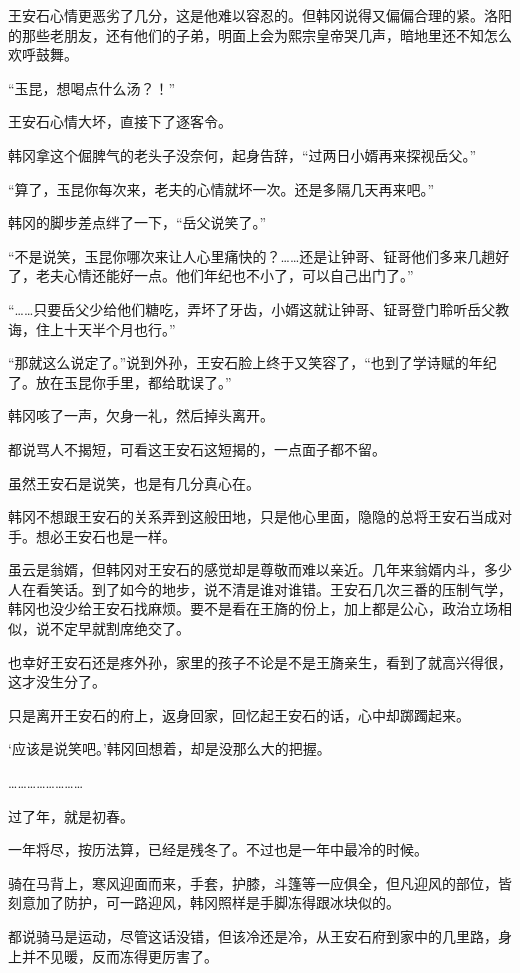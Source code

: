 王安石心情更恶劣了几分，这是他难以容忍的。但韩冈说得又偏偏合理的紧。洛阳的那些老朋友，还有他们的子弟，明面上会为熙宗皇帝哭几声，暗地里还不知怎么欢呼鼓舞。

“玉昆，想喝点什么汤？！”

王安石心情大坏，直接下了逐客令。

韩冈拿这个倔脾气的老头子没奈何，起身告辞，“过两日小婿再来探视岳父。”

“算了，玉昆你每次来，老夫的心情就坏一次。还是多隔几天再来吧。”

韩冈的脚步差点绊了一下，“岳父说笑了。”

“不是说笑，玉昆你哪次来让人心里痛快的？……还是让钟哥、钲哥他们多来几趟好了，老夫心情还能好一点。他们年纪也不小了，可以自己出门了。”

“……只要岳父少给他们糖吃，弄坏了牙齿，小婿这就让钟哥、钲哥登门聆听岳父教诲，住上十天半个月也行。”

“那就这么说定了。”说到外孙，王安石脸上终于又笑容了，“也到了学诗赋的年纪了。放在玉昆你手里，都给耽误了。”

韩冈咳了一声，欠身一礼，然后掉头离开。

都说骂人不揭短，可看这王安石这短揭的，一点面子都不留。

虽然王安石是说笑，也是有几分真心在。

韩冈不想跟王安石的关系弄到这般田地，只是他心里面，隐隐的总将王安石当成对手。想必王安石也是一样。

虽云是翁婿，但韩冈对王安石的感觉却是尊敬而难以亲近。几年来翁婿内斗，多少人在看笑话。到了如今的地步，说不清是谁对谁错。王安石几次三番的压制气学，韩冈也没少给王安石找麻烦。要不是看在王旖的份上，加上都是公心，政治立场相似，说不定早就割席绝交了。

也幸好王安石还是疼外孙，家里的孩子不论是不是王旖亲生，看到了就高兴得很，这才没生分了。

只是离开王安石的府上，返身回家，回忆起王安石的话，心中却踯躅起来。

‘应该是说笑吧。’韩冈回想着，却是没那么大的把握。

……………………

过了年，就是初春。

一年将尽，按历法算，已经是残冬了。不过也是一年中最冷的时候。

骑在马背上，寒风迎面而来，手套，护膝，斗篷等一应俱全，但凡迎风的部位，皆刻意加了防护，可一路迎风，韩冈照样是手脚冻得跟冰块似的。

都说骑马是运动，尽管这话没错，但该冷还是冷，从王安石府到家中的几里路，身上并不见暖，反而冻得更厉害了。

